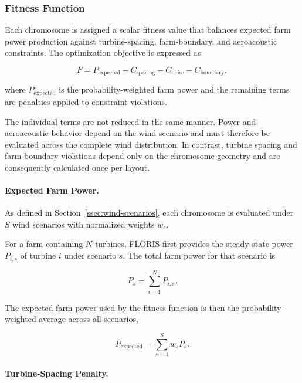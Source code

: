 \documentclass[11pt]{article}
\begin{document}
\subsubsection{Fitness Function}

Each chromosome is assigned a scalar fitness value that balances expected farm power production against turbine-spacing, farm-boundary, and aeroacoustic constraints. The optimization objective is expressed as

\begin{equation}
    F
    =
    P_{\mathrm{expected}}
    -
    C_{\mathrm{spacing}}
    -
    C_{\mathrm{noise}}
    -
    C_{\mathrm{boundary}},
    \label{eq:fitness}
\end{equation}

where $P_{\mathrm{expected}}$ is the probability-weighted farm power and the remaining terms are penalties applied to constraint violations.

The individual terms are not reduced in the same manner. Power and aeroacoustic behavior depend on the wind scenario and must therefore be evaluated across the complete wind distribution. In contrast, turbine spacing and farm-boundary violations depend only on the chromosome geometry and are consequently calculated once per layout.


\paragraph{Expected Farm Power.}

As defined in Section~\ref{ssec:wind-scenarios}, each chromosome is evaluated under $S$ wind scenarios with normalized weights $w_s$.

For a farm containing $N$ turbines, FLORIS first provides the steady-state power $P_{i,s}$ of turbine $i$ under scenario $s$. The total farm power for that scenario is

\begin{equation}
    P_s
    =
    \sum_{i=1}^{N} P_{i,s}.
    \label{eq:scenario-power}
\end{equation}

The expected farm power used by the fitness function is then the probability-weighted average across all scenarios,

\begin{equation}
    P_{\mathrm{expected}}
    =
    \sum_{s=1}^{S}
    w_s P_s.
    \label{eq:expected-power}
\end{equation}


\paragraph{Turbine-Spacing Penalty.}
\end{document}

